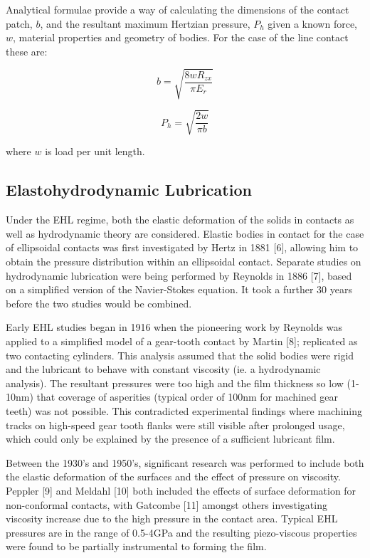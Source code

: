Analytical formulae provide a way of calculating the dimensions of the contact patch, $b$, and the resultant maximum Hertzian pressure, $P_h$ given a known force, $w$, material properties and geometry of bodies. For the case of the line contact these are:

\begin{equation}\label{eq2.3}
	b=\sqrt{\frac{8 w R_{z x}}{\pi E_r}}
\end{equation}

\begin{equation}\label{eq2.4}
	P_h=\sqrt{\frac{2 w}{\pi b}}
\end{equation}

where $w$ is load per unit length.

\subsection{Elastohydrodynamic Lubrication}

Under the EHL regime, both the elastic deformation of the solids in contacts as well as hydrodynamic theory are considered. Elastic bodies in contact for the case of ellipsoidal contacts was first investigated by Hertz in 1881 [6], allowing him to obtain the pressure distribution within an ellipsoidal contact. Separate studies on hydrodynamic lubrication were being performed by Reynolds in 1886 [7], based on a simplified version of the Navier-Stokes equation. It took a further 30 years before the two studies would be combined.

Early EHL studies began in 1916 when the pioneering work by Reynolds was applied to a simplified model of a gear-tooth contact by Martin [8]; replicated as two contacting cylinders. This analysis assumed that the solid bodies were rigid and the lubricant to behave with constant viscosity (ie. a hydrodynamic analysis). The resultant pressures were too high and the film thickness so low (1-10nm) that coverage of asperities (typical order of 100nm for machined gear teeth) was not possible. This contradicted experimental findings where machining tracks on high-speed gear tooth flanks were still visible after prolonged usage, which could only be explained by the presence of a sufficient lubricant film.

Between the 1930’s and 1950’s, significant research was performed to include both the elastic deformation of the surfaces and the effect of pressure on viscosity. Peppler [9] and Meldahl [10] both included the effects of surface deformation for non-conformal contacts, with Gatcombe [11] amongst others investigating viscosity increase due to the high pressure in the contact area. Typical EHL pressures are in the range of 0.5-4GPa and the resulting piezo-viscous properties were found to be partially instrumental to forming the film.

